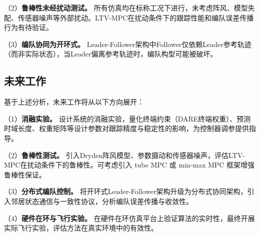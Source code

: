 （2）\textbf{鲁棒性未经扰动测试。} 所有仿真均在标称工况下进行，未考虑阵风、模型失配、传感器噪声等外部扰动。LTV-MPC在扰动条件下的跟踪性能和编队误差传播行为有待验证。

（3）\textbf{编队协同为开环式。} Leader-Follower架构中Follower仅依赖Leader参考轨迹（而非实际状态），当Leader偏离参考轨迹时，编队构型可能被破坏。

\subsection{未来工作}

基于上述分析，未来工作将从以下方向展开：

（1）\textbf{消融实验。} 设计系统的消融实验，量化终端约束（DARE终端权重）、预测时域长度、权重矩阵等设计参数对跟踪精度与稳定性的影响，为控制器调参提供指导。

（2）\textbf{鲁棒性测试。} 引入Dryden阵风模型、参数摄动和传感器噪声，评估LTV-MPC在扰动条件下的鲁棒性。可考虑引入 tube MPC 或 min-max MPC 框架增强鲁棒性保证\cite{Mayne2005}。

（3）\textbf{分布式编队控制。} 将开环式Leader-Follower架构升级为分布式协同架构，引入邻居状态通信与一致性协议，分析编队误差传播与收敛性\cite{Keviczky2008}。

（4）\textbf{硬件在环与飞行实验。} 在硬件在环仿真平台上验证算法的实时性，最终开展实际飞行实验，评估方法在真实环境中的有效性。
